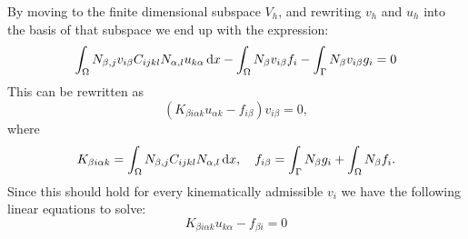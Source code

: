 \documentclass[fem.tex]{subfiles}
\begin{document}
%
By moving to the finite dimensional subspace $V_h$, and rewriting $v_h$ and $u_h$ into the basis of that subspace we end up with the expression:
%
\begin{equation} 
\int_\Omega  N_{\beta,j}v_{i\beta}   C_{ijkl} N_{\alpha,l} u_{k\alpha} \, \mathrm{d} x -\int_\Omega N_\beta v_{i\beta} f_i - \int_\Gamma N_\beta v_{i\beta} g_i = 0
\end{equation}
This can be rewritten as
\begin{equation} 
\left( K_{\beta i \alpha k}u_{\alpha k} - f_{i \beta} \right) v_{i\beta} = 0,
\end{equation}
where
\begin{equation} 
K_{\beta i \alpha k} = \int_\Omega  N_{\beta,j}C_{ijkl}N_{\alpha,l}  \, \mathrm{d} x , \quad f_{i \beta} = \int_\Gamma N_\beta g_i + \int_\Omega N_\beta f_i.
\end{equation}
Since this should hold for every kinematically admissible $v_i$ we have the following linear equations to solve:
\begin{equation} 
K_{\beta i \alpha k}u_{k \alpha} - f_{\beta i} = 0
\end{equation}
\end{document}
